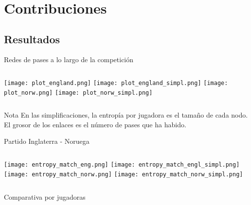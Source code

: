 \documentclass{beamer}
\begin{document}
\section{Contribuciones}

\subsection{Resultados}

\begin{frame}{Redes de pases a lo largo de la competición}
    \begin{columns}[t]
        \texttt{[image: plot\_england.png]}
        \texttt{[image: plot\_england\_simpl.png]}
        \texttt{[image: plot\_norw.png]}
        \texttt{[image: plot\_norw\_simpl.png]}
    \end{columns} 
	\begin{alertblock}{Nota}
		\textlatin{En las simplificaciones, la entropía por jugadora es el tamaño de cada nodo. El grosor de los enlaces es el 
	 	número de pases que ha habido.}
	\end{alertblock}
\end{frame}

\begin{frame}{Partido Inglaterra - Noruega}
		\begin{columns}[t]
			\texttt{[image: entropy\_match\_eng.png]}
			\texttt{[image: entropy\_match\_engl\_simpl.png]}
			\texttt{[image: entropy\_match\_norw.png]}
			\texttt{[image: entropy\_match\_norw\_simpl.png]}
		\end{columns} 
	\end{frame}

\begin{frame}{Comparativa por jugadoras}
	\begin{figure}
		\centering
	   \end{figure}
\end{frame}
\end{document}
